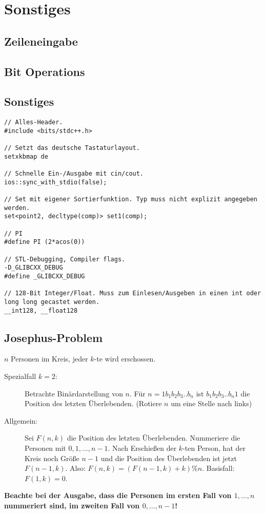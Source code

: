 \section{Sonstiges}

\subsection{Zeileneingabe}


\subsection{Bit Operations}


% 

\subsection{Sonstiges}
\begin{lstlisting}
// Alles-Header.
#include <bits/stdc++.h>

// Setzt das deutsche Tastaturlayout.
setxkbmap de

// Schnelle Ein-/Ausgabe mit cin/cout.
ios::sync_with_stdio(false);

// Set mit eigener Sortierfunktion. Typ muss nicht explizit angegeben werden.
set<point2, decltype(comp)> set1(comp);

// PI
#define PI (2*acos(0))

// STL-Debugging, Compiler flags.
-D_GLIBCXX_DEBUG
#define _GLIBCXX_DEBUG

// 128-Bit Integer/Float. Muss zum Einlesen/Ausgeben in einen int oder long long gecastet werden.
__int128, __float128
\end{lstlisting}

\subsection{Josephus-Problem}
$n$ Personen im Kreis, jeder $k$-te wird erschossen.
\begin{description}
	\item[Spezialfall $k=2$:] Betrachte Binärdarstellung von $n$.
	Für $n = 1b_1b_2b_3..b_n$ ist $b_1b_2b_3..b_n1$ die Position des letzten Überlebenden.
	(Rotiere $n$ um eine Stelle nach links)
	
	\item[Allgemein:] Sei $F(n,k)$ die Position des letzten Überlebenden.
	Nummeriere die Personen mit $0, 1, \ldots, n-1$.
	Nach Erschießen der $k$-ten Person, hat der Kreis noch Größe $n-1$ und die Position des Überlebenden ist jetzt $F(n-1,k)$.
	Also: $F(n,k) = (F(n-1,k)+k)\%n$. Basisfall: $F(1,k) = 0$. 
	
\end{description}
\textbf{Beachte bei der Ausgabe, dass die Personen im ersten Fall von $1, \ldots, n$ nummeriert sind, im zweiten Fall von $0, \ldots, n-1$!}

